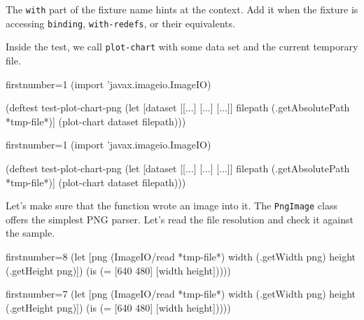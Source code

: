 \fi

The \verb|with| part of the fixture name hints at the context. Add it when the fixture is accessing \verb|binding|, \verb|with-redefs|, or their equivalents.


Inside the test, we call \verb|plot-chart| with some data set and the current temporary file.

\ifnarrow

\begin{english}
  \begin{clojure/lines*}{firstnumber=1}
(import 'javax.imageio.ImageIO)

(deftest test-plot-chart-png
 (let [dataset [[...] [...] [...]]
       filepath (.getAbsolutePath
                          *tmp-file*)]
   (plot-chart dataset filepath)))
  \end{clojure/lines*}
\end{english}

\else

\begin{english}
  \begin{clojure/lines*}{firstnumber=1}
(import 'javax.imageio.ImageIO)

(deftest test-plot-chart-png
  (let [dataset [[...] [...] [...]]
        filepath (.getAbsolutePath *tmp-file*)]
    (plot-chart dataset filepath)))
  \end{clojure/lines*}
\end{english}

\fi

\noindent
Let's make sure that the function wrote an image into it. The \verb|PngImage| class offers the simplest PNG parser. Let's read the file resolution and check it against the sample.

\ifnarrow

\begin{english}
  \begin{clojure/lines*}{firstnumber=8}
(let [png (ImageIO/read *tmp-file*)
      width (.getWidth png)
      height (.getHeight png)])
(is (= [640 480] [width height]))))
  \end{clojure/lines*}
\end{english}

\else

\begin{english}
  \begin{clojure/lines*}{firstnumber=7}
    (let [png (ImageIO/read *tmp-file*)
          width (.getWidth png)
          height (.getHeight png)])
    (is (= [640 480] [width height]))))
  \end{clojure/lines*}
\end{english}
\fi


